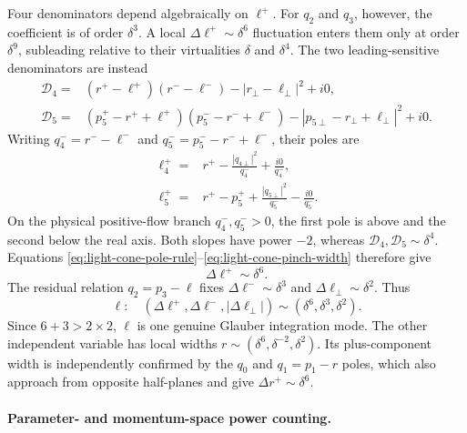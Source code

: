 \documentclass[a4paper,11pt]{article}
\begin{document}
Four denominators depend algebraically on \(\ell^+\).  For \(q_2\) and
\(q_3\), however, the coefficient is of order \(\delta^3\).  A local
\(\Delta\ell^+\sim\delta^6\) fluctuation enters them only at order
\(\delta^9\), subleading relative to their virtualities \(\delta\) and
\(\delta^4\).  The two leading-sensitive denominators are instead
\begin{equation}
\begin{aligned}
 \mathcal D_4={}&(r^+-\ell^+)(r^--\ell^-)
       -|r_\perp-\ell_\perp|^2+i0,\\
 \mathcal D_5={}&(p_5^+-r^++\ell^+)(p_5^--r^-+\ell^-)
       -|p_{5\perp}-r_\perp+\ell_\perp|^2+i0.
\end{aligned}
 \label{eq:five-mrk-sensitive-denominators}
\end{equation}
Writing \(q_4^-=r^--\ell^-\) and
\(q_5^-=p_5^--r^-+\ell^-\), their poles are
\begin{equation}
\begin{aligned}
 \ell_4^+={}&r^+-\frac{|q_{4\perp}|^2}{q_4^-}
              +\frac{i0}{q_4^-},\\
 \ell_5^+={}&r^+-p_5^++\frac{|q_{5\perp}|^2}{q_5^-}
              -\frac{i0}{q_5^-}.
\end{aligned}
 \label{eq:five-mrk-poles}
\end{equation}
On the physical positive-flow branch \(q_4^-,q_5^->0\), the first pole is
above and the second below the real axis.  Both slopes have power \(-2\),
whereas \(\mathcal D_4,\mathcal D_5\sim\delta^4\).  Equations
\eqref{eq:light-cone-pole-rule}--\eqref{eq:light-cone-pinch-width} therefore
give
\begin{equation}
 \Delta\ell^+\sim\delta^6.
 \label{eq:five-mrk-ellplus-width}
\end{equation}
The residual relation \(q_2=p_3-\ell\) fixes
\(\Delta\ell^-\sim\delta^3\) and
\(\Delta\ell_\perp\sim\delta^2\).  Thus
\begin{equation}
 \ell:\quad (\Delta\ell^+,\Delta\ell^-,
                   |\Delta\ell_\perp|)
       \sim(\delta^6,\delta^3,\delta^2).
 \label{eq:five-mrk-glauber-widths}
\end{equation}
Since \(6+3>2\times2\), \(\ell\) is one genuine Glauber integration mode.
The other independent variable has local widths
\(r\sim(\delta^6,\delta^{-2},\delta^2)\).  Its plus-component width
is independently confirmed by the \(q_0\) and \(q_1=p_1-r\) poles, which
also approach from opposite half-planes and give
\(\Delta r^+\sim\delta^6\).

\paragraph{Parameter- and momentum-space power counting.}
\end{document}
